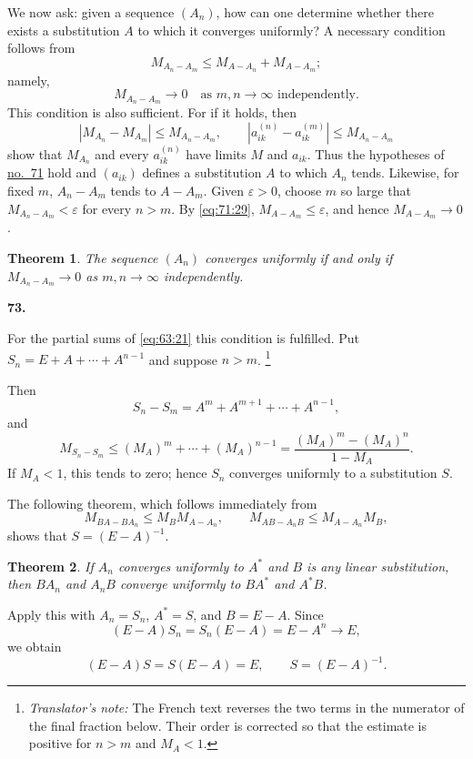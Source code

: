 \documentclass[
  paper=b5,
  fontsize=13pt,
  twoside=true,
  open=any,
  bookmarkpackage=false,
  chapterprefix=true,
  headings=normal
]{scrbook}
\newtheorem*{theorem}{Theorem}
\theoremstyle{definition}
\newcommand{\numberedparagraph}[1]{%
  \par\medskip\phantomsection\label{sec:#1}%
  \noindent\textbf{#1.}\enspace
}
\newcounter{translatornote}
\newcommand{\translatornotelabel}{T\arabic{translatornote}}
\newcommand{\translatornote}[1]{%
  \stepcounter{translatornote}%
  \begingroup
    \edef\savedfootnotenumber{\number\value{footnote}}%
    \renewcommand{\thefootnote}{\translatornotelabel}%
    \footnote{\emph{Translator's note:} #1}%
    \setcounter{footnote}{\savedfootnotenumber}%
  \endgroup
}
\begin{document}
We now ask: given a sequence $(A_n)$, how can one determine whether there
exists a substitution $A$ to which it converges uniformly? A necessary
condition follows from
\[
  M_{A_n-A_m}\leq M_{A-A_n}+M_{A-A_m};
\]
namely,
\begin{equation}
  M_{A_n-A_m}\longrightarrow0
  \quad\text{as $m,n\to\infty$ independently.}
  \tag{30}\label{eq:72:30}
\end{equation}
This condition is also sufficient. For if it holds, then
\[
 |M_{A_n}-M_{A_m}|\leq M_{A_n-A_m},
 \qquad
 |a_{ik}^{(n)}-a_{ik}^{(m)}|\leq M_{A_n-A_m}
\]
show that $M_{A_n}$ and every $a_{ik}^{(n)}$ have limits $M$ and $a_{ik}$.
Thus the hypotheses of \hyperref[sec:71]{no.~71} hold and $(a_{ik})$
defines a substitution $A$ to which $A_n$ tends. Likewise, for fixed $m$,
$A_n-A_m$ tends to $A-A_m$.
Given $\varepsilon>0$, choose $m$ so large that
$M_{A_n-A_m}<\varepsilon$ for every $n>m$. By \eqref{eq:71:29},
$M_{A-A_m}\leq\varepsilon$, and hence $M_{A-A_m}\to0$.

\begin{theorem}
The sequence $(A_n)$ converges uniformly if and only if
$M_{A_n-A_m}\to0$ as $m,n\to\infty$ independently.
\end{theorem}

\numberedparagraph{73}
For the partial sums of \eqref{eq:63:21} this condition is fulfilled. Put
$S_n=E+A+\cdots+A^{n-1}$ and suppose $n>m$.\translatornote{The French text
reverses the two terms in the numerator of the final fraction below.  Their
order is corrected so that the estimate is positive for $n>m$ and $M_A<1$.}
Then
\[
 S_n-S_m=A^m+A^{m+1}+\cdots+A^{n-1},
\]
and
\[
 M_{S_n-S_m}
 \leq(M_A)^m+\cdots+(M_A)^{n-1}
 =\frac{(M_A)^m-(M_A)^n}{1-M_A}.
\]
If $M_A<1$, this tends to zero; hence $S_n$ converges uniformly to a
substitution $S$.

The following theorem, which follows immediately from
\[
 M_{BA-BA_n}\leq M_BM_{A-A_n},
 \qquad
 M_{AB-A_nB}\leq M_{A-A_n}M_B,
\]
shows that $S=(E-A)^{-1}$.

\begin{theorem}
If $A_n$ converges uniformly to $A^*$ and $B$ is any linear substitution,
then $BA_n$ and $A_nB$ converge uniformly to $BA^*$ and $A^*B$.
\end{theorem}

Apply this with $A_n=S_n$, $A^*=S$, and $B=E-A$. Since
\[
 (E-A)S_n=S_n(E-A)=E-A^n\longrightarrow E,
\]
we obtain
\[
  (E-A)S=S(E-A)=E,
  \qquad S=(E-A)^{-1}.
\]
\end{document}
